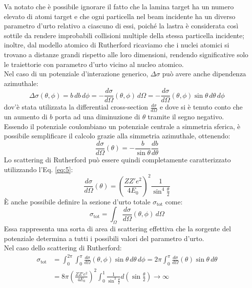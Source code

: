Va notato che è possibile ignorare il fatto che la lamina target ha un numero elevato di atomi target e che ogni particella nel beam incidente ha un diverso parametro d'urto relativo a ciascuno di essi, poiché la lastra è considerata così sottile da rendere improbabili collisioni multiple della stessa particella incidente; inoltre, dal modello atomico di Rutherford ricaviamo che i nuclei atomici si trovano a distanze grandi rispetto alle loro dimensioni, rendendo significative solo le traiettorie con parametro d'urto vicino al nucleo atomico.\\
Nel caso di un potenziale d'interazione generico, $ \Delta\sigma $ può avere anche dipendenza azimuthale:
\begin{equation}
	\Delta\sigma(\theta,\phi) = b \,db\,d\phi = - \frac{d\sigma}{d\Omega} (\theta,\phi) \,d\Omega= - \frac{d\sigma}{d\Omega} (\theta,\phi) \sin \theta \,d\theta\,d\phi
	\label{eq:6}
\end{equation}
dov'è stata utilizzata la differential cross-section $ \frac{d\sigma}{d\Omega} $ e dove si è tenuto conto che un aumento di $ b $ porta ad una diminuzione di $ \theta $ tramite il segno negativo.\\
Essendo il potenziale coulombiano un potenziale centrale a simmetria sferica, è possibile semplificare il calcolo grazie alla simmetria azimuthale, ottenendo:
\begin{equation}
	\frac{d\sigma}{d\Omega} (\theta) = - \frac{b}{\sin \theta} \frac{db}{d\theta}
	\label{eq:7}
\end{equation}
Lo scattering di Rutherford può essere quindi completamente caratterizzato utilizzando l'Eq. \ref{eq:5}:
\begin{equation}
	\frac{d\sigma}{d\Omega} (\theta) = \left( \frac{ZZ' e^2}{4 E_0} \right)^2 \frac{1}{\sin^4 \frac{\theta}{2}}
	\label{eq:8}
\end{equation}
È anche possibile definire la sezione d'urto totale $ \sigma_{\text{tot}} $ come:
\begin{equation}
	\sigma_{\text{tot}} = \int_{\Omega} \frac{d\sigma}{d\Omega} (\theta,\phi) \,d\Omega
	\label{eq:9}
\end{equation}
Essa rappresenta una sorta di area di scattering effettiva che la sorgente del potenziale determina a tutti i possibili valori del parametro d'urto.\\
Nel caso dello scattering di Rutherford:
\begin{equation}
	\begin{split}
		\sigma_{\text{tot}} &= \int_0^{2\pi} \int_0^{\pi} \frac{d\sigma}{d\Omega} (\theta,\phi) \sin \theta \,d\theta\,d\phi = 2\pi \int_0^{\pi} \frac{d\sigma}{d\Omega} (\theta) \sin \theta \,d\theta \\
				    &= 8\pi \left( \frac{ZZ' e^2}{4 E_0} \right)^2 \int_0^1 \frac{1}{\sin^3 \frac{\theta}{2}} d\left( \sin \frac{\theta}{2} \right) \longrightarrow \infty
	\end{split}
	\label{eq:10}
\end{equation}
